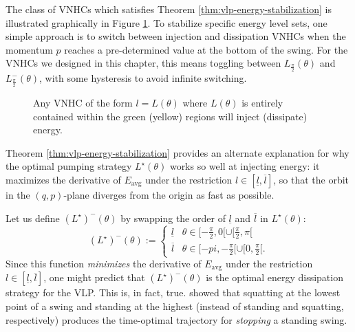 

The class of VNHCs which satisfies Theorem \ref{thm:vlp-energy-stabilization} is
illustrated graphically in Figure \ref{fig:vlp-energy-in-out}. 
To stabilize specific energy level sets, one simple approach is to switch
between injection and dissipation VNHCs when the momentum \(p\) reaches
a pre-determined value at the bottom of the swing.
For the VNHCs we designed in this chapter, this means toggling
between \(L_\frac{\pi}{2}(\theta)\) and \(L^{-}_\frac{\pi}{2}(\theta)\),
with some hysteresis to avoid infinite switching.  

\begin{figure}
   \centering
   
   \caption{Any VNHC of the form \(l = L(\theta)\) where \(L(\theta)\)
      is entirely contained within
      the green (yellow) regions will inject (dissipate) energy.}
      \label{fig:vlp-energy-in-out}
\end{figure}

Theorem \ref{thm:vlp-energy-stabilization} provides an alternate
explanation for why the optimal pumping strategy \(L^\star(\theta)\) works
so well at injecting energy: it maximizes the derivative of \(E_\text{avg}\)
under the restriction \(l \in [\underline{l},\overline{l}]\), so that the orbit
in the \((q,p)\)-plane diverges from the origin as fast as possible. 

Let us define \((L^\star)^{-}(\theta)\) by swapping the order of 
\(\underline{l}\) and \(\overline{l}\) in \(L^\star(\theta)\): 
\[
   (L^\star)^-(\theta) := \begin{cases}
      \underline{l} & \theta \in [-\frac{\pi}{2},0[ \cup [\frac{\pi}{2}, \pi[ \\
      \overline{l} & \theta \in [-pi, -\frac{\pi}{2}[ \cup [0,\frac{\pi}{2}[ 
      .
   \end{cases}
\]
Since this function \textit{minimizes} the derivative of \(E_\text{avg}\) under
the restriction \(l \in [\underline{l},\overline{l}]\), one might predict that 
\((L^\star)^{-}(\theta)\) is the optimal energy dissipation strategy for the VLP.
This is, in fact, true. \citet{pumping_swing_standing_squatting} showed 
that squatting at the lowest point of a swing and standing at the highest
(instead of standing and squatting, respectively) produces the
time-optimal trajectory for \textit{stopping} a standing swing. 

